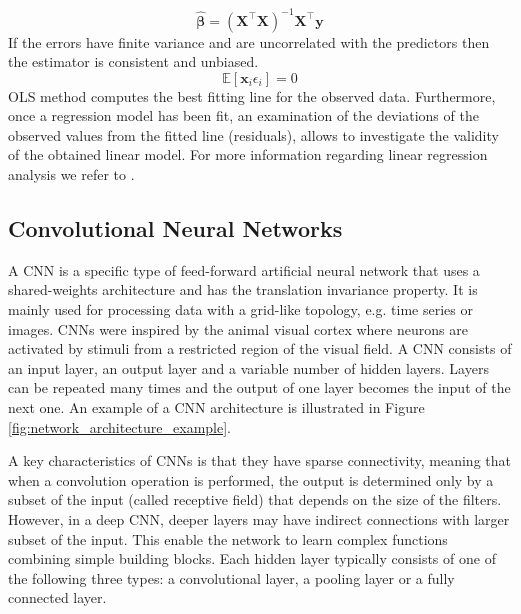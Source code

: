 \begin{equation}
    \hat{\bm{\beta}} = {(\mathbf{X}^\top\mathbf{X})^{-1}\mathbf{X}^\top\mathbf{y}}   
\end{equation}
If the errors have finite variance and are uncorrelated with the predictors then the estimator is consistent and unbiased.
\begin{equation}
    \mathbb{E}[\mathbf{x}_i \epsilon_i] = 0   
\end{equation}
\acs{OLS} method computes the best fitting line for the observed data. Furthermore, once a regression model has been fit, an examination of the deviations of the observed values from the fitted line (residuals), allows to investigate the validity of the obtained linear model. For more information regarding linear regression analysis we refer to \cite{montgomery_introduction_2012}.


\subsection{Convolutional Neural Networks}
A \acl{CNN} is a specific type of feed-forward artificial neural network that uses a shared-weights architecture and has the translation invariance property. It is mainly used for processing data with a grid-like topology, e.g. time series or images. \acsp{CNN} were inspired by the animal visual cortex where neurons are activated by stimuli from a restricted region of the visual field. A \acs{CNN} consists of an input layer, an output layer and a variable number of hidden layers. Layers can be repeated many times and the output of one layer becomes the input of the next one. An example of a \acs{CNN} architecture is illustrated in Figure \ref{fig:network_architecture_example}.

A key characteristics of \acsp{CNN} is that they have sparse connectivity, meaning that when a convolution operation is performed, the output is determined only by a subset of the input (called receptive field) that depends on the size of the filters. However, in a deep \acs{CNN}, deeper layers may have indirect connections with larger subset of the input. This enable the network to learn complex functions combining simple building blocks. Each hidden layer typically consists of one of the following three types: a convolutional layer, a pooling layer or a fully connected layer. \\ \\

